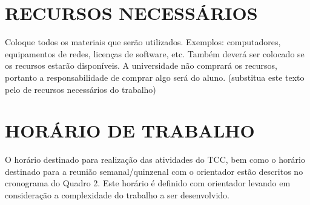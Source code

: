 
\section{RECURSOS NECESSÁRIOS}
\label{sec:recursos}
Coloque todos os materiais que serão utilizados. Exemplos: computadores, equipamentos de redes, licenças de software, etc. Também deverá ser colocado se os recursos estarão disponíveis. A universidade não comprará os recursos, portanto a responsabilidade de comprar algo será do aluno. (substitua este texto pelo de recursos necessários do trabalho)

\section{HORÁRIO DE TRABALHO}
\label{sec:horário}
O horário destinado para realização das atividades do TCC, bem como o horário destinado para a reunião semanal/quinzenal com o orientador estão descritos no cronograma do Quadro 2. Este horário é definido com orientador levando em consideração a complexidade do trabalho a ser desenvolvido.


